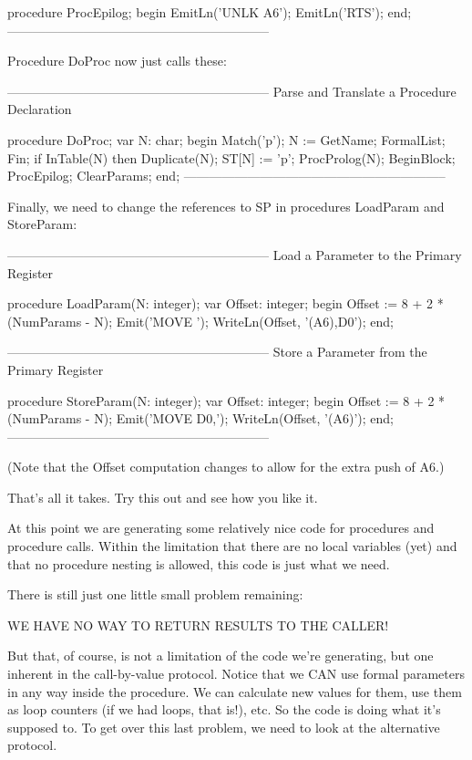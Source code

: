 \documentclass[float=false, crop=false]{standalone}
\begin{document}
procedure ProcEpilog;
begin
     EmitLn('UNLK A6');
     EmitLn('RTS');
end;
{--------------------------------------------------------------}


Procedure DoProc now just calls these:


{--------------------------------------------------------------}
{ Parse and Translate a Procedure Declaration }

procedure DoProc;
var N: char;
begin
     Match('p');
     N := GetName;
     FormalList;
     Fin;
     if InTable(N) then Duplicate(N);
     ST[N] := 'p';
     ProcProlog(N);
     BeginBlock;
     ProcEpilog;
     ClearParams;
end;
{--------------------------------------------------------------}


Finally, we need to change the references to SP in procedures LoadParam and
StoreParam:


{--------------------------------------------------------------}
{ Load a Parameter to the Primary Register }

procedure LoadParam(N: integer);
var Offset: integer;
begin
     Offset := 8 + 2 * (NumParams - N);
     Emit('MOVE ');
     WriteLn(Offset, '(A6),D0');
end;


{--------------------------------------------------------------}
{ Store a Parameter from the Primary Register }

procedure StoreParam(N: integer);
var Offset: integer;
begin
     Offset := 8 + 2 * (NumParams - N);
     Emit('MOVE D0,');
     WriteLn(Offset, '(A6)');
end;
{--------------------------------------------------------------}


(Note that the Offset computation changes to allow for the extra push of A6.)

That's all it takes. Try this out and see how you like it.

At this point we are generating some relatively nice code for procedures and
procedure calls. Within the limitation that there are no local variables (yet)
and that no procedure nesting is allowed, this code is just what we need.

There is still just one little small problem remaining:


     WE HAVE NO WAY TO RETURN RESULTS TO THE CALLER!


But that, of course, is not a limitation of the code we're generating, but one
inherent in the call-by-value protocol. Notice that we CAN use formal parameters
in any way inside the procedure. We can calculate new values for them, use them
as loop counters (if we had loops, that is!), etc. So the code is doing what
it's supposed to. To get over this last problem, we need to look at the
alternative protocol.
\end{document}
